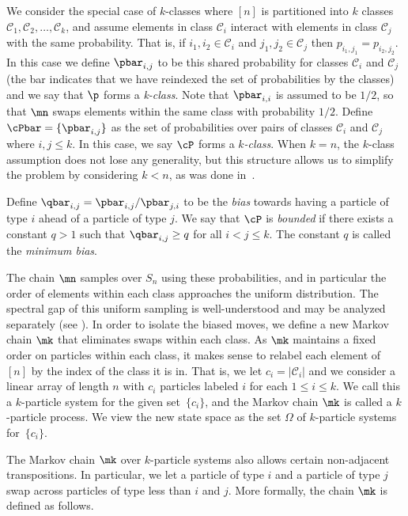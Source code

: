 We consider the special case of $k$-classes where $[n]$ is partitioned 
into $k$ classes $\mathcal{C}_1,\mathcal{C}_2,\ldots, \mathcal{C}_k$, 
and assume elements in class $\mathcal{C}_i$ interact with elements in 
class $\mathcal{C}_j$ with the same probability.  That is, if 
$i_1,i_2\in \mathcal{C}_i$ and $j_1,j_2\in \mathcal{C}_j$ then 
$p_{i_1,j_1} = p_{i_2,j_2}$.  In this case we define $\pbar_{i,j}$ to 
be this shared probability for classes $\mathcal{C}_i$ and 
$\mathcal{C}_j$ (the bar indicates that we have reindexed the set of 
probabilities by the classes) and we say that $\p$ forms a 
\emph{k-class}.  Note that $\pbar_{i,i}$ is assumed to be $1/2$, so 
that $\mn$ swaps elements within the same class with probability $1/2$.  
Define $\cPbar=\{\pbar_{i,j}\}$ as the set of probabilities over pairs 
of classes $\mathcal{C}_i$ and $\mathcal{C}_j$ where $i,j\leq k$.  In 
this case, we say $\cP$ forms a \emph{$k$-class}.  When $k=n$, the 
$k$-class assumption does not lose any generality, but this structure 
allows us to simplify the problem by considering $k<n$, as was done 
in~\cite{MS,HW16}. 

Define $\qbar_{i,j} =  \pbar_{i,j}/\pbar_{j,i}$ to be the \emph{bias} 
towards having a particle of type $i$ ahead of a particle of type $j$.  
We say that $\cP$ is \emph{bounded} if there exists a constant $q>1$ 
such that $\qbar_{i,j}\geq q$ for all $i<j\leq k$.  The constant $q$ is 
called the \emph{minimum bias}. 

The chain $\mn$ samples over $S_n$ using these probabilities, and in 
particular the order of elements within each class approaches the 
uniform distribution.  The spectral gap of this uniform sampling is 
well-understood and may be analyzed separately (see 
).  In order to isolate the biased moves, we define 
a new Markov chain $\mk$ that eliminates swaps within each class.  As 
$\mk$ maintains a fixed order on particles within each class, it makes 
sense to relabel each element of $[n]$ by the index of the class it is 
in.  That is, we let $c_i = |\mathcal{C}_i|$ and we consider a linear 
array of length $n$ with $c_i$ particles labeled $i$ for each $1\leq 
i\leq k$.  We call this a $k$-particle system for the given 
set~$\{c_i\}$, and the Markov chain $\mk$ is called a $k$-particle 
process.  We view the new state space as the set $\Omega$ of 
$k$-particle systems for~$\{c_i\}$.


The Markov chain $\mk$ over $k$-particle systems also allows certain 
non-adjacent transpositions.  In particular, we let a particle of type 
$i$ and a particle of type $j$ swap across particles of type less than 
$i$ and $j$.  More formally, the chain $\mk$ is defined as follows.


